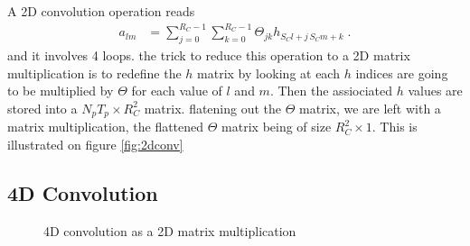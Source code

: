 \begin{subappendices}
A 2D convolution operation reads
\begin{align}
a_{lm}&=\sum_{j=0}^{R_C-1}\sum_{k=0}^{R_C-1}\Theta_{jk}h_{S_Cl+j\,S_Cm+k}\;.
\end{align}
and it involves 4 loops. the trick to reduce this operation to a 2D matrix multiplication is to redefine the $h$ matrix by looking at each $h$ indices are going to be multiplied by $\Theta$ for each value of $l$ and $m$. Then the assiociated $h$ values are stored into a $N_pT_p\times R_C^2$ matrix. flatening out the $\Theta$ matrix, we are left with a matrix multiplication, the flattened $\Theta$ matrix being of size $R_C^2\times 1$. This is illustrated on figure \ref{fig:2dconv}

\subsection{4D Convolution}

\begin{figure}[H]
\begin{center}
\caption{\label{fig:4dconv}4D convolution as a 2D matrix multiplication}
\end{center}
\end{figure}




\end{subappendices}
